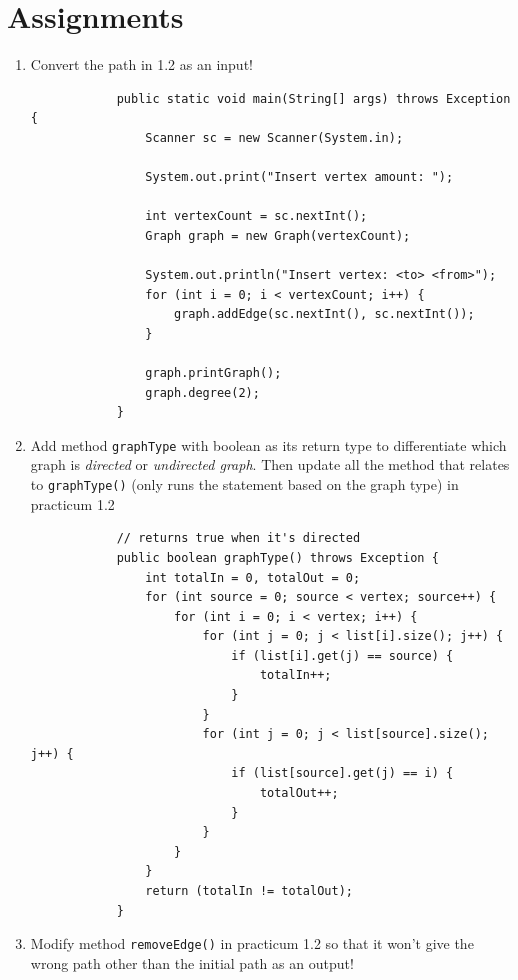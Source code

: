 \documentclass[12pt,titlepage]{article}
\begin{document}
\section{Assignments}
\begin{enumerate}
    \item {
        Convert the path in 1.2 as an input!

        \begin{verbatim}
            public static void main(String[] args) throws Exception {
                Scanner sc = new Scanner(System.in);

                System.out.print("Insert vertex amount: ");

                int vertexCount = sc.nextInt();
                Graph graph = new Graph(vertexCount);

                System.out.println("Insert vertex: <to> <from>");
                for (int i = 0; i < vertexCount; i++) {
                    graph.addEdge(sc.nextInt(), sc.nextInt());
                }

                graph.printGraph();
                graph.degree(2);
            }
        \end{verbatim}
    }
    \item {
        Add method \texttt{graphType} with boolean as its return type to differentiate which graph is \textit{directed}
        or \textit{undirected graph}. Then update all the method that relates to \texttt{graphType()} (only runs the
        statement based on the graph type) in practicum 1.2

        \begin{verbatim}
            // returns true when it's directed
            public boolean graphType() throws Exception {
                int totalIn = 0, totalOut = 0;
                for (int source = 0; source < vertex; source++) {
                    for (int i = 0; i < vertex; i++) {
                        for (int j = 0; j < list[i].size(); j++) {
                            if (list[i].get(j) == source) {
                                totalIn++;
                            }
                        }
                        for (int j = 0; j < list[source].size(); j++) {
                            if (list[source].get(j) == i) {
                                totalOut++;
                            }
                        }
                    }
                }
                return (totalIn != totalOut);
            }
        \end{verbatim}
    }
    \item {
        Modify method \texttt{removeEdge()} in practicum 1.2 so that it won't give the wrong path other than the initial path as an output!

}
\end{enumerate}
\end{document}
